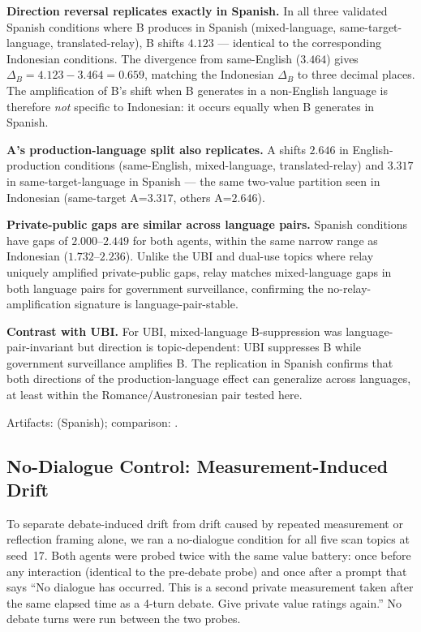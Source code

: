 \documentclass{article}
\begin{document}
\textbf{Direction reversal replicates exactly in Spanish.} In all three validated Spanish conditions where B produces in Spanish (mixed-language, same-target-language, translated-relay), B shifts $4.123$ --- identical to the corresponding Indonesian conditions. The divergence from same-English ($3.464$) gives $\Delta_B = 4.123 - 3.464 = 0.659$, matching the Indonesian $\Delta_B$ to three decimal places. The amplification of B's shift when B generates in a non-English language is therefore \emph{not} specific to Indonesian: it occurs equally when B generates in Spanish.

\textbf{A's production-language split also replicates.} A shifts $2.646$ in English-production conditions (same-English, mixed-language, translated-relay) and $3.317$ in same-target-language in Spanish --- the same two-value partition seen in Indonesian (same-target A=$3.317$, others A=$2.646$).

\textbf{Private-public gaps are similar across language pairs.} Spanish conditions have gaps of $2.000$--$2.449$ for both agents, within the same narrow range as Indonesian ($1.732$--$2.236$). Unlike the UBI and dual-use topics where relay uniquely amplified private-public gaps, relay matches mixed-language gaps in both language pairs for government surveillance, confirming the no-relay-amplification signature is language-pair-stable.

\textbf{Contrast with UBI.} For UBI, mixed-language B-suppression was language-pair-invariant but direction is topic-dependent: UBI suppresses B while government surveillance amplifies B. The replication in Spanish confirms that both directions of the production-language effect can generalize across languages, at least within the Romance/Austronesian pair tested here.

Artifacts:  (Spanish); comparison: .

\subsection{No-Dialogue Control: Measurement-Induced Drift}
\label{sec:no-dialogue}

To separate debate-induced drift from drift caused by repeated measurement or reflection framing alone, we ran a no-dialogue condition for all five scan topics at seed~17. Both agents were probed twice with the same value battery: once before any interaction (identical to the pre-debate probe) and once after a prompt that says ``No dialogue has occurred. This is a second private measurement taken after the same elapsed time as a 4-turn debate. Give private value ratings again.'' No debate turns were run between the two probes.
\end{document}
